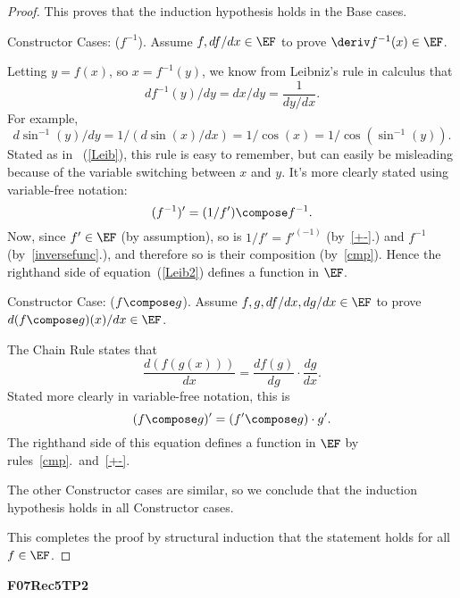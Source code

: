 \documentclass[handout]{mcs}
\begin{document}
\begin{problem}
{\begin{proof}
This proves that the induction hypothesis holds in the Base cases.

\item[Constructor Cases:] ($f^{-1}$).  Assume $f, df/dx \in \EF$ to 
prove
$\deriv f^{-1}(x) \in \EF$.

Letting $y = f(x)$, so $x=f^{-1}(y)$, we know from Leibniz's rule in
calculus that
\begin{equation}\label{Leib}
df^{-1}(y)/dy = dx/dy = \frac{1}{dy/dx}.
\end{equation}
For example,
\[
d \sin^{-1}(y)/dy = 1/(d \sin(x)/dx) = 1/\cos(x) = 1/\cos(\sin^{-1}(y)).
\]
Stated as in ~(\ref{Leib}), this rule is easy to remember, but can 
easily
be misleading because of the variable switching between $x$ and $y$.
It's more clearly stated using variable-free notation:
\begin{equation}\label{Leib2}
(f^{-1})' = (1/f') \compose f^{-1}.
\end{equation}
Now, since $f' \in \EF$ (by assumption), so is $1/f' = f'^{(-1)}$ 
(by~\ref{+-}.) and
$f^{-1}$ (by~\ref{inversefunc}.), and therefore so is their composition
(by~\ref{cmp}).  Hence the righthand side of equation~(\ref{Leib2})
defines a function in $\EF$.

\item[Constructor Case:] ($f \compose g$).  Assume $f, g, df/dx, dg/dx 
\in \EF$
to prove $d(f \compose g)(x)/dx \in \EF$.

The Chain Rule states that
\[
\frac{d(f(g(x)))}{dx} = \frac{d f(g)}{dg}\cdot\frac{dg}{dx}.
\]
Stated more clearly in variable-free notation, this is
\[
(f \compose g)' = (f' \compose g) \cdot g'.
\]
The righthand side of this equation defines a function in $\EF$ by
rules~\ref{cmp}.\ and~\ref{+-}.

The other Constructor cases are similar, so we conclude that the 
induction
hypothesis holds in all Constructor cases.

This completes the proof by structural induction that the statement 
holds
for all $f \in \EF$.
\end{proof}
}

\end{problem}

\large\textbf{F07Rec5TP2}
\end{document}

